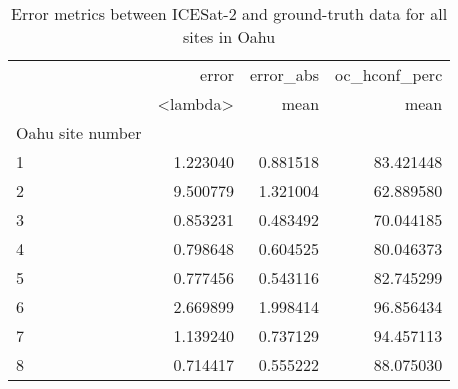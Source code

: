 \begin{table}[h!]
\caption{Error metrics between ICESat-2 and ground-truth data for all sites in Oahu}
\begin{tabular}{lrrr}
 & error & error_abs & oc_hconf_perc \\
 & <lambda> & mean & mean \\
Oahu site number &  &  &  \\
1 & 1.223040 & 0.881518 & 83.421448 \\
2 & 9.500779 & 1.321004 & 62.889580 \\
3 & 0.853231 & 0.483492 & 70.044185 \\
4 & 0.798648 & 0.604525 & 80.046373 \\
5 & 0.777456 & 0.543116 & 82.745299 \\
6 & 2.669899 & 1.998414 & 96.856434 \\
7 & 1.139240 & 0.737129 & 94.457113 \\
8 & 0.714417 & 0.555222 & 88.075030 \\
\end{tabular}
\end{table}
